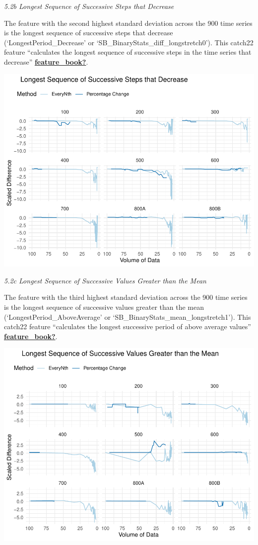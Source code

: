 \documentclass{article}
\begin{document}
\emph{5.2b Longest Sequence of Successive Steps that Decrease}

The feature with the second highest standard deviation across the 900
time series is the longest sequence of successive steps that decrease
(`LongestPeriod\_Decrease' or `SB\_BinaryStats\_diff\_longstretch0').
This catch22 feature ``calculates the longest sequence of successive
steps in the time series that decrease''
\protect\hyperlink{ref-feature_book}{\textbf{feature\_book?}}.

\includegraphics{210431461_CSC8639_Dissertation_files/figure-latex/LongestDecrease-1.pdf}

\emph{5.2c Longest Sequence of Successive Values Greater than the Mean}

The feature with the third highest standard deviation across the 900
time series is the longest sequence of successive values greater than
the mean (`LongestPeriod\_AboveAverage' or
`SB\_BinaryStats\_mean\_longstretch1'). This catch22 feature
``calculates the longest successive period of above average values''
\protect\hyperlink{ref-feature_book}{\textbf{feature\_book?}}.

\includegraphics{210431461_CSC8639_Dissertation_files/figure-latex/LongestGreater-1.pdf}
\end{document}
